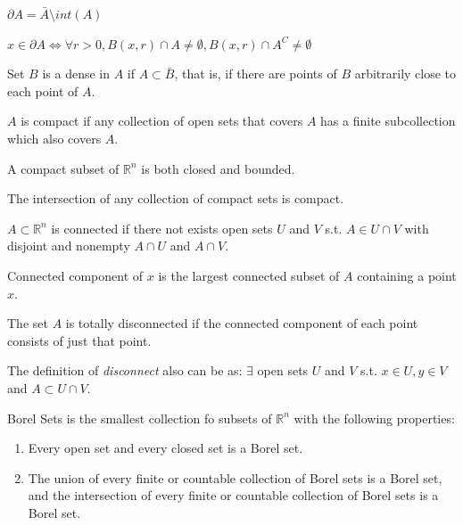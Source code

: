 \begin{definition}[Boundary]
    $\partial A = \bar{A}\setminus int(A)$
\end{definition}

\begin{theorem}
    $x\in\partial A \Leftrightarrow \forall r > 0, B(x, r) \cap A \neq \emptyset, B(x, r) \cap A^C \neq \emptyset$ 
\end{theorem}

\begin{definition}[Dense]
    Set $B$ is a dense in $A$ if $A\subset \bar{B}$, that is, if there are points of $B$ arbitrarily close to each point of $A$.
\end{definition}

\begin{definition}[Compact]
    $A$ is compact if any collection of open sets that covers $A$ has a finite subcollection which also covers $A$.
\end{definition}

\begin{theorem}
    A compact subset of $\mathbb{R}^n$ is both closed and bounded.
\end{theorem}

\begin{theorem}
    The intersection of any collection of compact sets is compact.
\end{theorem}

\begin{definition}[Connected]
    $A\subset \mathbb{R}^n$ is connected if there not exists open sets $U$ and $V$ s.t. $A\in U\cap V$ with disjoint and nonempty $A\cap U$ and $A\cap V$.
\end{definition}

\begin{definition}
Connected component of $x$ is the largest connected subset of $A$ containing a point $x$.
\end{definition}

\begin{definition}[Disconnect]
    The set $A$ is totally disconnected if the connected component of each point consists of just that point.
\end{definition}

The definition of \textit{disconnect} also can be as: $\exists$ open sets $U$ and $V$ s.t. $x\in U, y\in V$ and $A\subset U\cap V$.

\begin{definition}
    Borel Sets is the smallest collection fo subsets of $\mathbb{R}^n$ with the following properties:
    \begin{enumerate}
        \item Every open set and every closed set is a Borel set.
        \item The union of every finite or countable collection of Borel sets is a Borel set, and the intersection of every finite or countable collection of Borel sets is a Borel set.
    \end{enumerate}
\end{definition}

